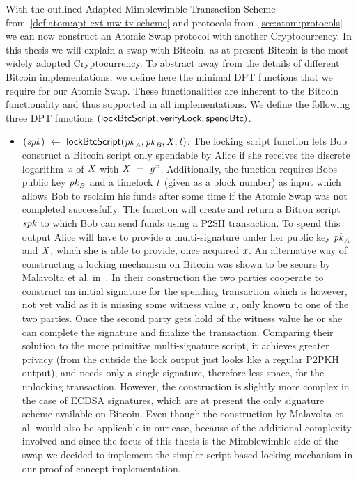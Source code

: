With the outlined Adapted Mimblewimble Transaction Scheme from~\cref{def:atom:apt-ext-mw-tx-scheme} and protocols from~\cref{sec:atom:protocols} we can now construct an Atomic Swap protocol with another Cryptocurrency.
In this thesis we will explain a swap with Bitcoin, as at present Bitcoin is the most widely adopted Cryptocurrency.
To abstract away from the details of different Bitcoin implementations, we define here the minimal DPT functions that we require for our Atomic Swap.
These functionalities are inherent to the Bitcoin functionality and thus supported in all implementations.
We define the following three DPT functions $(\mathsf{lockBtcScript}, \mathsf{verifyLock}, \mathsf{spendBtc})$.
\begin{itemize}
    \item $(\mathit{spk}) ~\leftarrow~ \mathsf{lockBtcScript} (\mathit{pk}_{\mathit{A}},\mathit{pk}_{\mathit{B}},\mathit{X},\mathit{t})$:
    The locking script function lets Bob construct a Bitcoin script only spendable by Alice if she receives the discrete logarithm $\mathit{x}$ of $\mathit{X}$ with $\mathit{X} ~=~ \mathit{g}^{\mathit{x}}$.
    Additionally, the function requires Bobs public key $\mathit{pk}_{\mathit{B}}$ and a timelock $\mathit{t}$ (given as a block number) as input which allows Bob to reclaim his funds after some time if the Atomic Swap was not completed successfully.
    The function will create and return a Bitcon script $\mathit{spk}$ to which Bob can send funds using a P2SH transaction.
    To spend this output Alice will have to provide a multi-signature under her public key $\mathit{pk}_{\mathit{A}}$ and $\mathit{X}$, which she is able to provide, once acquired $\mathit{x}$.
    An alternative way of constructing a locking mechanism on Bitcoin was shown to be secure by Malavolta et al. in~\cite{malavolta2019anonymous}.
    In their construction the two parties cooperate to construct an initial signature for the spending transaction which is however, not yet valid as it is missing some witness value $\mathit{x}$, only known to one of the two parties.
    Once the second party gets hold of the witness value he or she can complete the signature and finalize the transaction.
    Comparing their solution to the more primitive multi-signature script, it achieves greater privacy (from the outside the lock output just looks like a regular P2PKH output), and needs only a single signature, therefore less space, for the unlocking transaction.
    However, the construction is slightly more complex in the case of ECDSA signatures, which are at present the only signature scheme available on Bitcoin.
    Even though the construction by Malavolta et al. would also be applicable in our case, because of the additional complexity involved and since the focus of this thesis is the Mimblewimble side of the swap we decided to implement the simpler script-based locking mechanism in our proof of concept implementation.

\end{itemize}
